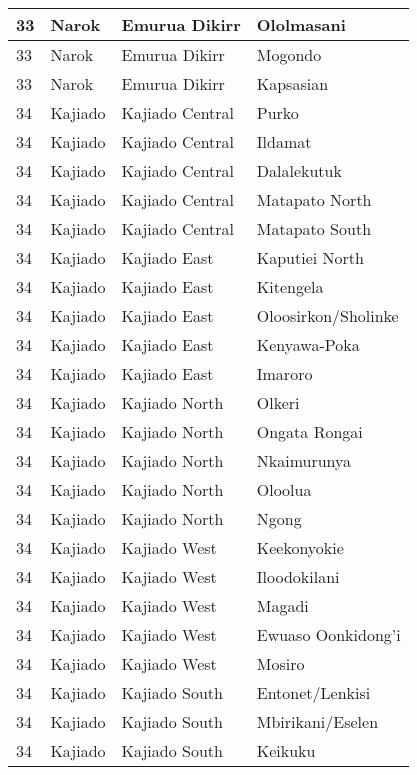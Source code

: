 \begin{table}[!ht]
\begin{tabular}{|l|l|l|l|}
        33 & Narok & Emurua Dikirr & Ololmasani \\ \hline
        33 & Narok & Emurua Dikirr & Mogondo \\ \hline
        33 & Narok & Emurua Dikirr & Kapsasian \\ \hline
        34 & Kajiado & Kajiado Central & Purko \\ \hline
        34 & Kajiado & Kajiado Central & Ildamat \\ \hline
        34 & Kajiado & Kajiado Central & Dalalekutuk \\ \hline
        34 & Kajiado & Kajiado Central & Matapato North \\ \hline
        34 & Kajiado & Kajiado Central & Matapato South \\ \hline
        34 & Kajiado & Kajiado East & Kaputiei North \\ \hline
        34 & Kajiado & Kajiado East & Kitengela \\ \hline
        34 & Kajiado & Kajiado East & Oloosirkon/Sholinke \\ \hline
        34 & Kajiado & Kajiado East & Kenyawa-Poka \\ \hline
        34 & Kajiado & Kajiado East & Imaroro \\ \hline
        34 & Kajiado & Kajiado North & Olkeri \\ \hline
        34 & Kajiado & Kajiado North & Ongata Rongai \\ \hline
        34 & Kajiado & Kajiado North & Nkaimurunya \\ \hline
        34 & Kajiado & Kajiado North & Oloolua \\ \hline
        34 & Kajiado & Kajiado North & Ngong \\ \hline
        34 & Kajiado & Kajiado West & Keekonyokie \\ \hline
        34 & Kajiado & Kajiado West & Iloodokilani \\ \hline
        34 & Kajiado & Kajiado West & Magadi \\ \hline
        34 & Kajiado & Kajiado West & Ewuaso Oonkidong’i \\ \hline
        34 & Kajiado & Kajiado West & Mosiro \\ \hline
        34 & Kajiado & Kajiado South & Entonet/Lenkisi \\ \hline
        34 & Kajiado & Kajiado South & Mbirikani/Eselen \\ \hline
        34 & Kajiado & Kajiado South & Keikuku \\ \hline

\end{tabular}
\end{table}
